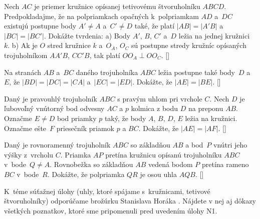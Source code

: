 {Nech $AC$ je priemer kružnice opísanej tetivovému štvoruholníku $ABCD$. Predpokladajme,
že na polpriamkach opačných
k~polpriamkam $AD$ a~$DC$ existujú postupne body $A'\ne A$ a~$C'\ne D$ také, že
platí $|AB|=|A'B|$ a~$|BC|=|BC'|$. Dokážte tvrdenia:
\hfil\break
a) Body $A'$, $B$, $C'$ a~$D$ ležia na jednej kružnici~$k$.\hfil\break
b) Ak je $O$ stred kružnice $k$ a~$O_A$, $O_C$ sú postupne stredy
kružníc opísaných trojuholníkom $AA'B$, $CC'B$, tak platí $OO_A\perp OO_C$.
[]

Na stranách $AB$ a~$BC$ daného trojuholníka $ABC$ ležia postupne také body~$D$ a~$E$, že $|BD|=|DC|=|CA|$ a~$|EC|=|ED|$. Dokážte, že $|AE|=|BE|$.
[]

Daný je pravouhlý trojuholník $ABC$ s pravým uhlom pri vrchole $C$.
Nech $D$ je ľubovoľný vnútorný bod odvesny $AC$ a $p$ kolmica z bodu $D$
na preponu $AB$. Označme $E\ne D$ bod priamky $p$ taký, že
body $A$, $B$, $D$, $E$ ležia na kružnici. Označme ešte~$F$
priesečník priamok $p$ a $BC$. Dokážte, že $|AE|=|AF|$.
[]

Daný je rovnoramenný trojuholník $ABC$ so základňou $AB$ a bod~$P$
vnútri jeho výšky z~vrcholu $C$.
Priamka $AP$ pretína kružnicu opísanú trojuholníku $ABC$ v~bode~$Q\ne A$.
Rovnobežka so základňou $AB$ vedená bodom $P$ pretína rameno~$BC$
v~bode~$R$. Dokážte, že polpriamka $QR$ je osou uhla $AQB$.
[]

{\everypar{}
\smallskip
K~téme súťažnej úlohy (uhly, ktoré spájame s~kružnicami,
tetivové štvoruholníky) odporúčame brožúrku Stanislava Horáka .
Nájdete v nej aj dôkazy všetkých poznatkov, ktoré sme pripomenuli pred
uvedením úlohy N1.
\smallskip
}

}

